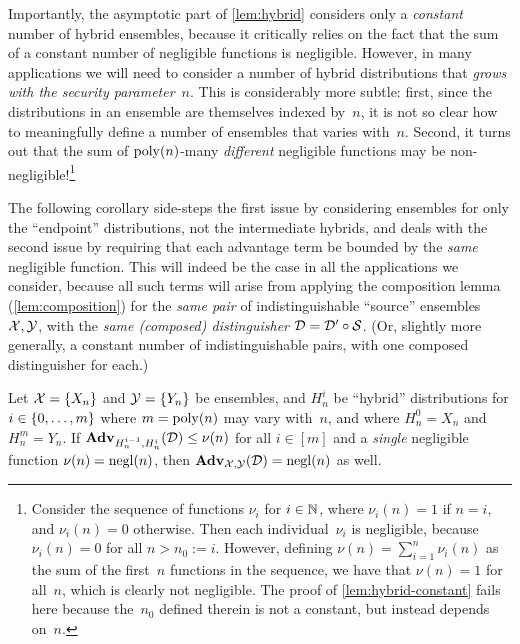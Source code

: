 \documentclass[11pt]{article}
\begin{document}
Importantly, the asymptotic part of \cref{lem:hybrid} considers only a \emph{constant} number of hybrid ensembles, because it critically relies on the fact that the sum of a constant number of negligible functions is negligible.
However, in many applications we will need to consider a number of hybrid distributions that \emph{grows with the security parameter}~$n$.
This is considerably more subtle: first, since the distributions in an ensemble are themselves indexed by~$n$, it is not so clear how to meaningfully define a number of ensembles that varies with~$n$.
Second, it turns out that the sum of $\operatorname{poly}(n)$-many \emph{different} negligible functions may be non-negligible!\footnote{Consider the sequence of functions $\nu_{i}$ for $i \in \mathbb{N}$, where $\nu_{i}(n) = 1$ if $n=i$, and $\nu_{i}(n)=0$ otherwise.
  Then each individual~$\nu_{i}$ is negligible, because $\nu_{i}(n) = 0$ for all $n > n_{0} := i$.
  However, defining $\nu(n) = \sum_{i=1}^{n} \nu_{i}(n)$ as the sum of the first~$n$ functions in the sequence, we have that $\nu(n) = 1$ for all~$n$, which is clearly not negligible.
  The proof of \cref{lem:hybrid-constant} fails here because the~$n_{0}$ defined therein is not a constant, but instead depends on~$n$.}

The following corollary side-steps the first issue by considering ensembles for only the ``endpoint'' distributions, not the intermediate hybrids, and deals with the second issue by requiring that each advantage term be bounded by the \emph{same} negligible function.
This will indeed be the case in all the applications we consider, because all such terms will arise from applying the composition lemma (\cref{lem:composition}) for the \emph{same pair} of indistinguishable ``source'' ensembles $\mathcal{X},\mathcal{Y}$, with the \emph{same (composed) distinguisher} $\mathcal{D} = \mathcal{D}' \circ \mathcal{S}$.
(Or, slightly more generally, a constant number of indistinguishable pairs, with one composed distinguisher for each.)

\begin{corollary}
  \label{cor:hybrid-poly}
  Let $\mathcal{X} = \{X_{n}\}$ and $\mathcal{Y} = \{Y_{n}\}$ be ensembles, and $H^{i}_{n}$ be ``hybrid'' distributions for $i \in \{0, \ldots, m\}$ where $m=\operatorname{poly}(n)$ may vary with~$n$, and where $H^{0}_{n} = X_{n}$ and $H^{m}_{n} = Y_{n}$.
  If $\mathbf{Adv}_{H_{n}^{i-1},H_{n}^{i}}(\mathcal{D}) \leq \nu(n)$ for all $i \in [m]$ and a \emph{single} negligible function $\nu(n) = \operatorname{negl}(n)$, then $\mathbf{Adv}_{\mathcal{X},\mathcal{Y}}(\mathcal{D}) = \operatorname{negl}(n)$ as well.
\end{corollary}
\end{document}
